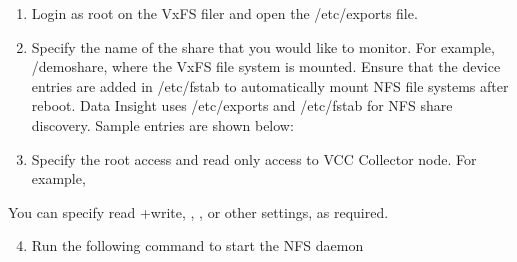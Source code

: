 \documentclass[letterpaper,10pt,english]{sphinxmanual}
\begin{document}
\begin{enumerate}
\item {} 
Login as root on the VxFS filer and open the /etc/exports file.

\item {} 
Specify the name of the share that you would like to monitor.  For example, /demoshare, where the VxFS file system is mounted. Ensure that the device entries are added in /etc/fstab to automatically mount NFS file systems after reboot. Data Insight uses /etc/exports and /etc/fstab for NFS share discovery. Sample entries are shown below:

\end{enumerate}
\begin{description}
\item[{\sphinxcode{root@RHEL5-VxFS \textasciitilde{}{]}\# cat /etc/fstab \textbar{} grep vxfs}}] \leavevmode
{}

\end{description}
\begin{enumerate}
\setcounter{enumi}{2}
\item {} 
Specify the root access and read only access to VCC Collector node. For example,

\end{enumerate}


You can specify read +write, , ,  or other settings, as required.
\begin{enumerate}
\setcounter{enumi}{3}
\item {} 
Run the following command to start the NFS daemon

\end{enumerate}

\end{document}
